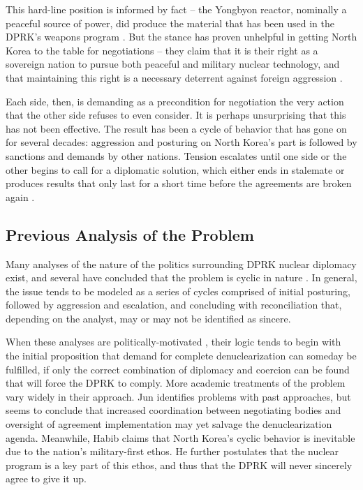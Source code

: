 \documentclass{article}
\begin{document}
This hard-line position is informed by fact – the Yongbyon reactor, nominally a peaceful source of power, did produce the material that has been used in the DPRK’s weapons program \cite{hecker}. But the stance has proven unhelpful in getting North Korea to the table for negotiations – they claim that it is their right as a sovereign nation to pursue both peaceful and military nuclear technology, and that maintaining this right is a necessary deterrent against foreign aggression \cite{kcna,kcna2}.

Each side, then, is demanding as a precondition for negotiation the very action that the other side refuses to even consider. It is perhaps unsurprising that this has not been effective. The result has been a cycle of behavior that has gone on for several decades: aggression and posturing on North Korea’s part is followed by sanctions and demands by other nations. Tension escalates until one side or the other begins to call for a diplomatic solution, which either ends in stalemate or produces results that only last for a short time before the agreements are broken again \cite{bajoria, davenport}.

\subsection{Previous Analysis of the Problem}

Many analyses of the nature of the politics surrounding DPRK nuclear diplomacy exist, and several have concluded that the problem is cyclic in nature \cite{blair,cfr,fisher,gause,habib,jun}. In general, the issue tends to be modeled as a series of cycles comprised of initial posturing, followed by aggression and escalation, and concluding with reconciliation that, depending on the analyst, may or may not be identified as sincere.

When these analyses are politically-motivated \cite{blair, cfr}, their logic tends to begin with the initial proposition that demand for complete denuclearization can someday be fulfilled, if only the correct combination of diplomacy and coercion can be found that will force the DPRK to comply. More academic treatments of the problem \cite{habib,jun} vary widely in their approach. Jun \cite{jun} identifies problems with past approaches, but seems to conclude that increased coordination between negotiating bodies and oversight of agreement implementation may yet salvage the denuclearization agenda. Meanwhile, Habib \cite{habib} claims that North Korea’s cyclic behavior is inevitable due to the nation’s military-first ethos. He further postulates that the nuclear program is a key part of this ethos, and thus that the DPRK will never sincerely agree to give it up.
\end{document}
